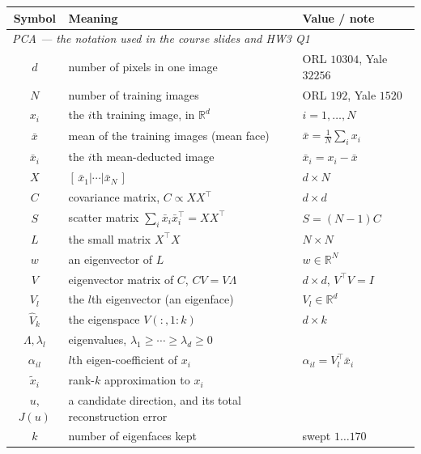 \documentclass[11pt]{article}
\theoremstyle{definition}
\theoremstyle{remark}
\newcommand{\R}{\mathbb{R}}
\begin{document}
\begin{table}[htbp]
\centering
\small
\begin{tabular}{cll}
\toprule
Symbol & Meaning & Value / note \\
\midrule
\multicolumn{3}{l}{\emph{PCA --- the notation used in the course slides and HW3 Q1}}\\
$d$                & number of pixels in one image            & ORL $10304$, Yale $32256$ \\
$N$                & number of training images                & ORL $192$, Yale $1520$ \\
$x_i$              & the $i$th training image, in $\R^d$      & $i = 1,\dots,N$ \\
$\bar{x}$          & mean of the training images (mean face)  & $\bar{x}=\tfrac1N\sum_i x_i$ \\
$\bar{x}_i$        & the $i$th mean-deducted image            & $\bar{x}_i = x_i - \bar{x}$ \\
$X$                & $[\,\bar{x}_1|\cdots|\bar{x}_N\,]$       & $d\times N$ \\
$C$                & covariance matrix, $C \propto XX^{\!\top}$ & $d\times d$ \\
$S$                & scatter matrix $\sum_i \bar{x}_i\bar{x}_i^{\!\top} = XX^{\!\top}$ & $S=(N-1)C$ \\
$L$                & the small matrix $X^{\!\top}\!X$          & $N\times N$ \\
$w$                & an eigenvector of $L$                    & $w\in\R^N$ \\
$V$                & eigenvector matrix of $C$, $CV=V\Lambda$ & $d\times d$, $V^{\!\top}V=I$ \\
$V_l$              & the $l$th eigenvector (an eigenface)     & $V_l\in\R^d$ \\
$\hat{V}_k$        & the eigenspace $V(:,1{:}k)$              & $d\times k$ \\
$\Lambda,\lambda_l$ & eigenvalues, $\lambda_1\ge\cdots\ge\lambda_d\ge 0$ & \\
$\alpha_{il}$      & $l$th eigen-coefficient of $x_i$         & $\alpha_{il}=V_l^{\!\top}\bar{x}_i$ \\
$\tilde{x}_i$      & rank-$k$ approximation to $x_i$          & \\
$u$, $J(u)$        & a candidate direction, and its total reconstruction error & \\
$k$                & number of eigenfaces kept                & swept $1\ldots170$ \\

\end{tabular}
\end{table}
\end{document}
